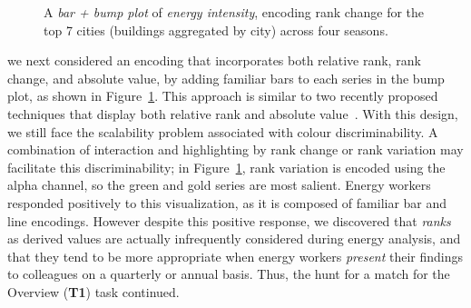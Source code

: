 \documentclass[journal]{vgtc}                %
\newcommand{\bstart}[1]{\vspace{1mm} \noindent{\textbf{#1:}}}
\begin{document}
\begin{figure}[ht]
    \vspace{-0.3cm}
	\centering
	\vspace{-0.15cm}
	\caption{A \textsl{bar + bump plot} of \textsl{energy intensity}, encoding rank change for the top 7 cities (buildings aggregated by city) across four seasons.}
	\label{fig:sandbox-barbump}
\end{figure}

\bstart{Bump + bar plots} we next considered an encoding that incorporates both relative rank, rank change, and absolute value, by adding familiar bars to each series in the bump plot, as shown in Figure~\ref{fig:sandbox-barbump}. 
This approach is similar to two recently proposed techniques that display both relative rank and absolute value~\cite{Gratzl2013,Hur2013}. 
With this design, we still face the scalability problem associated with colour discriminability.
A combination of interaction and highlighting by rank change or rank variation may facilitate this discriminability; in Figure~\ref{fig:sandbox-barbump}, rank variation is encoded using the alpha channel, so the green and gold series are most salient.
Energy workers responded positively to this visualization, as it is composed of familiar bar and line encodings. 
However despite this positive response, we discovered that {\it ranks} as derived values are actually infrequently considered during energy analysis, and that they tend to be more appropriate when energy workers {\it present} their findings to colleagues on a quarterly or annual basis.
Thus, the hunt for a match for the Overview ({\bf T1}) task continued.

\end{document}
